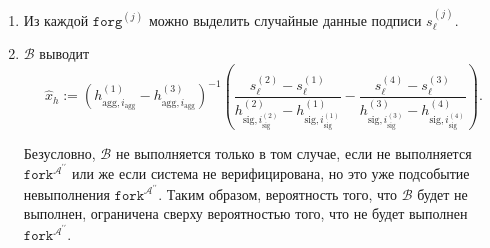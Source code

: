 \documentclass{mrl}
\theoremstyle{definition}
\numberwithin{theorem}{subsection}
\newcommand{\adversary}{\mathcal{A}}
\begin{document}
\begin{description}
\begin{enumerate}
\item Из каждой $\texttt{forg}^{(j)}$ можно выделить случайные данные подписи $s_{\ell}^{(j)}$.

\item $\mathcal{B}$ выводит \[\widehat{x}_h := (h_{\text{agg}, i_{\text{agg}}}^{(1)} - h_{\text{agg}, i_{\text{agg}}}^{(3)})^{-1}\left(\frac{s_\ell^{(2)} - s_\ell^{(1)}}{h_{\text{sig}, i_{\text{sig}}^{(2)}}^{(2)} -h_{\text{sig}, i_{\text{sig}}^{(1)}}^{(1)}} - \frac{s_\ell^{(4)} - s_\ell^{(3)}}{h_{\text{sig}, i_{\text{sig}}^{(3)}}^{(3)} -h_{\text{sig}, i_{\text{sig}}^{(4)}}^{(4)}}\right). \]

Безусловно, $\mathcal{B}$ не выполняется только в том случае, если не выполняется $\texttt{fork}^{\adversary^{\prime \prime}}$ или же если система не верифицирована, но это уже подсобытие невыполнения $\texttt{fork}^{\adversary^{\prime \prime}}$. Таким образом, вероятность того, что $\mathcal{B}$ будет не выполнен, ограничена сверху вероятностью того, что не будет выполнен $\texttt{fork}^{\adversary^{\prime \prime}}$.
\end{enumerate}
\end{description}

\end{document}
